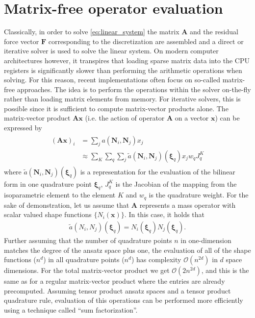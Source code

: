 \documentclass[times,doublespace]{nmeauth}
\def\gz  #1{           \mbox{$\boldsymbol{#1}$}}
\begin{document}
\section{Matrix-free operator evaluation}
\label{sec:mf}
Classically, in order to solve \eqref{eq:linear_system} the matrix $\gz A$ and the {\color{red}residual} force vector $\gz F$ corresponding to the discretization are assembled and
a direct or iterative solver is used to solve the linear system.
On modern computer architectures however, it transpires that loading sparse matrix data into the CPU registers is significantly slower than performing the arithmetic operations when solving.
For this reason, recent implementations often focus on so-called matrix-free approaches. The idea is to perform the operations within the solver on-the-fly
rather than loading matrix elements from memory.
For iterative solvers, this is possible since it is sufficient to compute matrix-vector products alone.
%
The matrix-vector product $\gz A \gz x$ {\color{red}(i.e. the action of operator $\gz A$ on a vector $\gz x$)} can be expressed by
\begin{align}
  \begin{split}
 (\gz A \gz x)_i &= \sum_j a(\gz N_i,\gz N_j) x_j \\
        &\approx \sum_K \sum_q \sum_j \tilde{a}(\gz N_i,\gz N_j)(\gz \xi_q) x_j w_q J^K_q
  \end{split}
  \label{eq:mf_vmult}
\end{align}
where $\tilde{a}(\gz N_i,\gz N_j)(\gz \xi_q)$ is a representation for the evaluation of the bilinear form in one quadrature point $\gz \xi_q$, $J^K_q$ is the Jacobian of the mapping from the isoparametric element to the element $K$ {\color{red}and
$w_q$ is the quadrature weight}.
For the sake of demonstration, let us assume that $\gz A$ represents a mass {\color{red}operator} with scalar valued shape functions $\{ N_i(\gz x) \}$. In this case, it holds that
\begin{align*}
 \tilde{a}(N_i,N_j)(\gz \xi_q) = N_i(\gz \xi_q)N_j(\gz \xi_q).
\end{align*}
Further assuming that the number of quadrature points $n$ in one-dimension matches the degree of the ansatz space plus one, the evaluation of all of the shape functions ($n^d$)
in all quadrature points ($n^d$) has complexity $\mathcal{O}(n^{2d})$ {\color{red}in $d$ space dimensions}.
For the total matrix-vector product we get $\mathcal{O}(2n^{2d})$,
and this is the same as for a regular matrix-vector product where the entries are already precomputed. Assuming tensor product ansatz spaces and a tensor product quadrature rule, evaluation of this operations can be performed more efficiently using a technique called ``sum factorization''.
\end{document}
